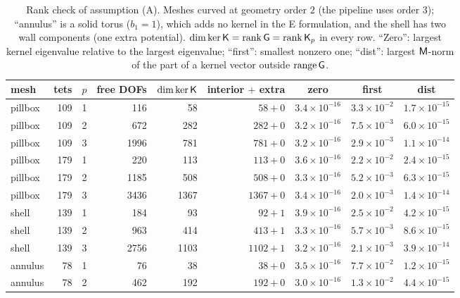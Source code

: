 \begin{table}[t]
\centering
\caption{Rank check of assumption (A). Meshes curved at geometry order $2$ (the pipeline uses order $3$); ``annulus'' is a solid torus ($b_1=1$), which adds no kernel in the E formulation, and the shell has two wall components (one extra potential). $\dim\ker\Kmat=\operatorname{rank}\Gmat=\operatorname{rank}\Kp$ in every row. ``Zero'': largest kernel eigenvalue relative to the largest eigenvalue; ``first'': smallest nonzero one; ``dist'': largest $\mathsf{M}$-norm of the part of a kernel vector outside $\mathrm{range}\,\mathsf{G}$.}
\label{tab:A04-rank}
\footnotesize
\setlength{\tabcolsep}{4pt}
\begin{tabular}{@{}lrrrrrccc@{}}
\toprule
mesh & tets & $p$ & free DOFs & $\dim\ker\mathsf{K}$ & interior $+$ extra & zero & first & dist \\
\midrule
pillbox & 109 & 1 & 116 & 58 & $58+0$ & $3.4\!\times\!10^{-16}$ & $3.3\!\times\!10^{-2}$ & $1.7\!\times\!10^{-15}$ \\
pillbox & 109 & 2 & 672 & 282 & $282+0$ & $3.2\!\times\!10^{-16}$ & $7.5\!\times\!10^{-3}$ & $6.0\!\times\!10^{-15}$ \\
pillbox & 109 & 3 & 1996 & 781 & $781+0$ & $3.2\!\times\!10^{-16}$ & $2.9\!\times\!10^{-3}$ & $1.1\!\times\!10^{-14}$ \\
pillbox & 179 & 1 & 220 & 113 & $113+0$ & $3.6\!\times\!10^{-16}$ & $2.2\!\times\!10^{-2}$ & $2.4\!\times\!10^{-15}$ \\
pillbox & 179 & 2 & 1185 & 508 & $508+0$ & $3.3\!\times\!10^{-16}$ & $5.2\!\times\!10^{-3}$ & $6.3\!\times\!10^{-15}$ \\
pillbox & 179 & 3 & 3436 & 1367 & $1367+0$ & $3.4\!\times\!10^{-16}$ & $2.0\!\times\!10^{-3}$ & $1.4\!\times\!10^{-14}$ \\
shell & 139 & 1 & 184 & 93 & $92+1$ & $3.9\!\times\!10^{-16}$ & $2.5\!\times\!10^{-2}$ & $4.2\!\times\!10^{-15}$ \\
shell & 139 & 2 & 963 & 414 & $413+1$ & $3.3\!\times\!10^{-16}$ & $5.7\!\times\!10^{-3}$ & $8.6\!\times\!10^{-15}$ \\
shell & 139 & 3 & 2756 & 1103 & $1102+1$ & $3.2\!\times\!10^{-16}$ & $2.1\!\times\!10^{-3}$ & $3.9\!\times\!10^{-14}$ \\
annulus & 78 & 1 & 76 & 38 & $38+0$ & $3.5\!\times\!10^{-16}$ & $7.7\!\times\!10^{-2}$ & $1.2\!\times\!10^{-15}$ \\
annulus & 78 & 2 & 462 & 192 & $192+0$ & $3.0\!\times\!10^{-16}$ & $1.3\!\times\!10^{-2}$ & $4.4\!\times\!10^{-15}$ \\

\end{tabular}
\end{table}
